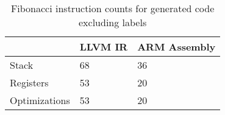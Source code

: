 \begin{table}[h!]
\centering
\begin{tabular}{p{}p{}p{}}
  \hline
 & LLVM IR & ARM Assembly \\ 
  \hline
Stack &  68 &  36 \\ 
  Registers &  53 &  20 \\ 
  Optimizations &  53 &  20 \\ 
   \hline
\end{tabular}
\caption{Fibonacci instruction counts for generated code excluding labels}
\end{table}
